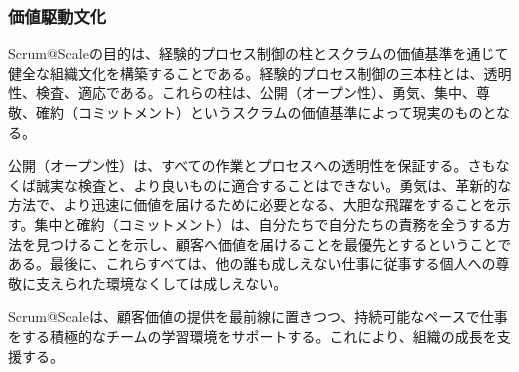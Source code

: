 \documentclass[12pt,a4paper,parskip=full]{scrartcl}
\begin{document}

\subsubsection{価値駆動文化}\label{values-driven-culture}

Scrum@Scaleの目的は、経験的プロセス制御の柱とスクラムの価値基準を通じて健全な組織文化を構築することである。経験的プロセス制御の三本柱とは、透明性、検査、適応である。これらの柱は、公開（オープン性）、勇気、集中、尊敬、確約（コミットメント）というスクラムの価値基準によって現実のものとなる。

公開（オープン性）は、すべての作業とプロセスへの透明性を保証する。さもなくば誠実な検査と、より良いものに適合することはできない。勇気は、革新的な方法で、より迅速に価値を届けるために必要となる、大胆な飛躍をすることを示す。集中と確約（コミットメント）は、自分たちで自分たちの責務を全うする方法を見つけることを示し、顧客へ価値を届けることを最優先とするということである。最後に、これらすべては、他の誰も成しえない仕事に従事する個人への尊敬に支えられた環境なくしては成しえない。

Scrum@Scaleは、顧客価値の提供を最前線に置きつつ、持続可能なペースで仕事をする積極的なチームの学習環境をサポートする。これにより、組織の成長を支援する。


\iffalse
\end{document}
